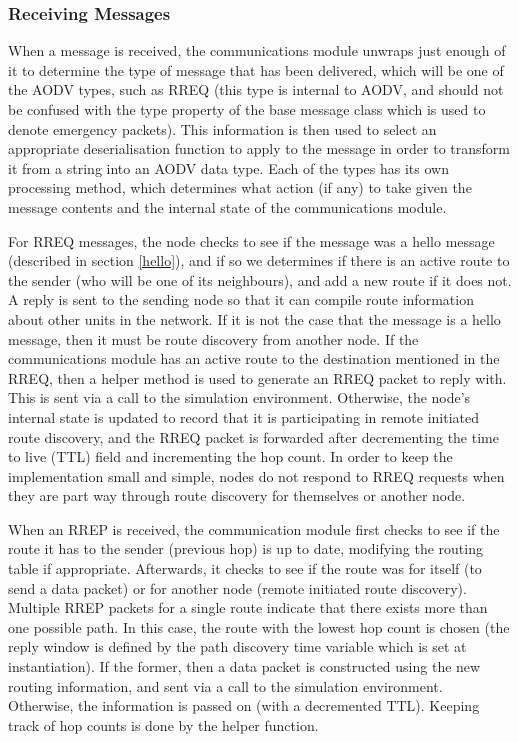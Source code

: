 \subsubsection{Receiving Messages}
When a message is received, the communications module unwraps just enough of it to determine the type of message that has been delivered, which will be one of the AODV types, such as RREQ (this type is internal to AODV, and should not be confused with the type property of the base message class which is used to denote emergency packets). This information is then used to select an appropriate deserialisation function to apply to the message in order to transform it from a string into an AODV data type. Each of the types has its own processing method, which determines what action (if any) to take given the message contents and the internal state of the communications module.

For RREQ messages, the node checks to see if the message was a hello message (described in section \ref{hello}), and if so we determines if there is an active route to the sender (who will be one of its neighbours), and add a new route if it does not. A reply is sent to the sending node so that it can compile route information about other units in the network. If it is not the case that the message is a hello message, then it must be route discovery from another node. If the communications module has an active route to the destination mentioned in the RREQ, then a helper method is used to generate an RREQ packet to reply with. This is sent via a call to the simulation environment. Otherwise, the node's internal state is updated to record that it is participating in remote initiated route discovery, and the RREQ packet is forwarded after decrementing the time to live (TTL) field and incrementing the hop count. In order to keep the implementation small and simple, nodes do not respond to RREQ requests when they are part way through route discovery for themselves or another node.

When an RREP is received, the communication module first checks to see if the route it has to the sender (previous hop) is up to date, modifying the routing table if appropriate. Afterwards, it checks to see if the route was for itself (to send a data packet) or for another node (remote initiated route discovery). Multiple RREP packets for a single route indicate that there exists more than one possible path. In this case, the route with the lowest hop count is chosen (the reply window is defined by the path discovery time variable which is set at instantiation). If the former, then a data packet is constructed using the new routing information, and sent via a call to the simulation environment. Otherwise, the information is passed on (with a decremented TTL). Keeping track of hop counts is done by the helper function.

